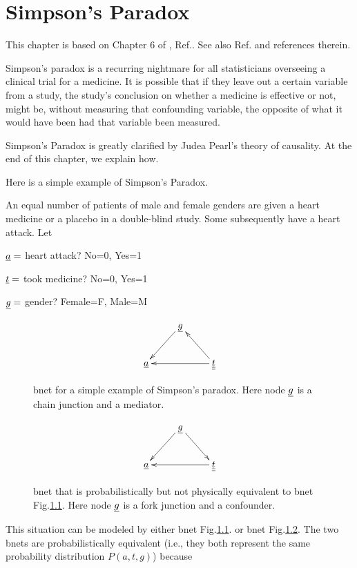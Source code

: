 \chapter{Simpson's Paradox}
\label{ch-simpson}
This chapter 
is based on Chapter 6 of 
, Ref.\cite{book-why}.
See also
Ref.\cite{wiki-simpson}
and references therein.


Simpson's paradox is a recurring 
nightmare for all statisticians 
overseeing a clinical trial for 
a medicine. It is possible that
 if they leave out a certain 
 variable from a study,
the study's conclusion on whether
 a medicine is effective or not, might be,
 without measuring that confounding variable, 
the opposite of what it would have 
been had that variable been measured.

Simpson's Paradox is greatly clarified
 by Judea Pearl's theory of causality.
 At the end of this chapter, 
we explain how.

Here is a simple example of 
Simpson's Paradox.

An equal 
number of  patients of male and 
female genders
 are given a heart medicine or a placebo 
in a double-blind study.
 Some subsequently have a heart 
attack. Let

$ \ul{a}=$ heart attack? No=0, Yes=1

$ \ul{t}=$ took medicine? No=0, Yes=1

$ \ul{g}=$ gender? Female=F, Male=M



\begin{figure}[h!]
\centering
$$\xymatrix{
&\rvg\ar[dl]&\\
\rva&&\ul{\rvt}\ar[ul]\ar[ll]
}$$
\caption{bnet for a simple example of 
Simpson's paradox.
Here node $\rvg$ is 
a chain junction and a mediator.}
\label{fig-simpson-chain}
\end{figure}

\begin{figure}[h!]
\centering
$$\xymatrix{
&\rvg\ar[dl]\ar[dr]&\\
\rva&&\ul{\rvt}\ar[ll]
}$$
\caption{bnet that is probabilistically
but not physically
equivalent to bnet
Fig.\ref{fig-simpson-chain}.
Here node $\rvg$ is 
a fork junction and a confounder.}
\label{fig-simpson-fork}
\end{figure}




This situation can be modeled by 
either
bnet Fig.\ref{fig-simpson-chain}.
or bnet
 Fig.\ref{fig-simpson-fork}.
The two bnets are 
probabilistically
equivalent 
(i.e., they
both represent the same
probability distribution $P(a, t, g)$)
because


